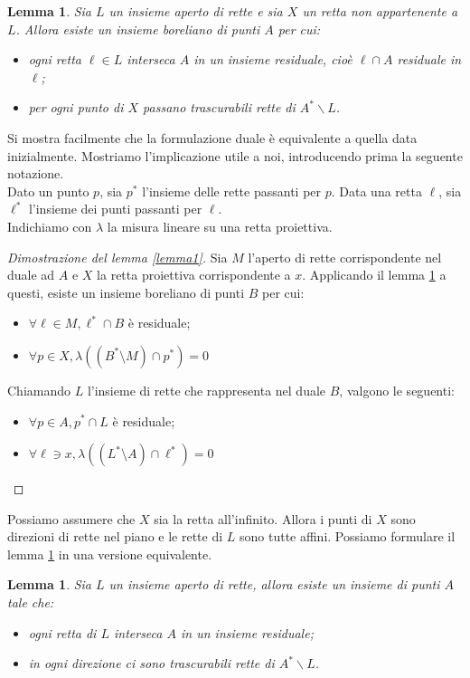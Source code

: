 \documentclass[a4paper, twoside,openright]{article}
\newcommand{\fa}{\forall}
\newcommand{\<}{\langle}
\renewcommand{\>}{\rangle}
\newtheorem{lemma}[teo]{Lemma}
\begin{document}
\begin{lemma} \label{lemma2}
Sia $L$ un insieme aperto di rette e sia $X$ un retta non appartenente a $L$. Allora esiste un insieme boreliano di punti $A$ per cui:

\begin{itemize}
	\item ogni retta $\ell \in L$ interseca $A$ in un insieme residuale, cioè $\ell \cap A$ residuale in $\ell$;
	\item per ogni punto di $X$ passano trascurabili rette di $A^{*} \backslash L$.
\end{itemize}
\end{lemma}

	Si mostra facilmente che la formulazione duale è equivalente a quella data inizialmente. Mostriamo l'implicazione utile a noi, introducendo prima la seguente notazione.\\
	Dato un punto $p$, sia $p^*$ l'insieme delle rette passanti per $p$. Data una retta $\ell$, sia $\ell^*$ l'insieme dei punti passanti per $\ell$.\\
	Indichiamo con $\lambda$ la misura lineare su una retta proiettiva.
	
\begin{proof} [Dimostrazione del lemma \ref{lemma1}]
	Sia $M$ l'aperto di rette corrispondente nel duale ad $A$ e $X$ la retta proiettiva corrispondente a $x$. Applicando il lemma \ref{lemma2} a questi, esiste un insieme boreliano di punti $B$ per cui:
	\begin{itemize}
		\item $\fa \ell \in M, \ell^* \cap B$ è residuale;
		\item $\fa p \in X, \lambda((B^* \setminus M) \cap p^*)=0$
	\end{itemize}
	Chiamando $L$ l'insieme di rette che rappresenta nel duale $B$, valgono le seguenti:
	\begin{itemize}
		\item 	$\fa p \in A, p^* \cap L$ è residuale;
		\item 	$\fa \ell \ni x, \lambda((L^* \setminus A) \cap \ell^*)=0$
	\end{itemize}
\end{proof}

Possiamo assumere che $X$ sia la retta all'infinito. Allora i punti di $X$ sono direzioni di rette nel piano e le rette di $L$ sono tutte affini. Possiamo formulare il lemma \ref{lemma2} in una versione equivalente.

\begin{lemma} \label{lemma2bello}
Sia $L$ un insieme aperto di rette, allora esiste un insieme di punti $A$ tale che:
\begin{itemize}
	\item ogni retta di $L$ interseca $A$ in un insieme residuale;
	\item in ogni direzione ci sono trascurabili rette di  $A^{*} \backslash L$.
\end{itemize}
\end{lemma}
\end{document}
